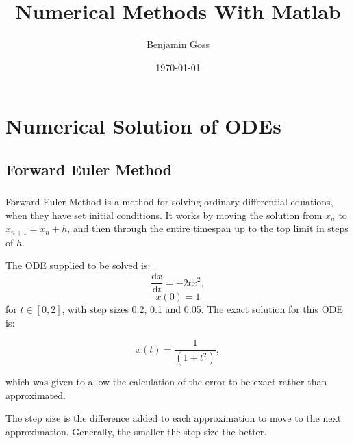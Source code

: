 \documentclass[a4paper]{article}
\title{Numerical Methods With Matlab}
\author{Benjamin Goss}
\date{\today}
\begin{document}
\maketitle


\section{Numerical Solution of ODEs}
\subsection{Forward Euler Method}
\subsubsection{}

Forward Euler Method is a method for solving ordinary differential equations, when they have set initial conditions. It works by moving the solution from $x_n$ to $x_{n+1} = x_n + h$, and then through the entire timespan up to the top limit in steps of $h$. 


The ODE supplied to be solved is:
$$\frac{\mathrm{d}x}{\mathrm{d}t} = -2tx^2,$$ $$x(0) = 1$$
for $t \in [0,2]$, with step sizes 0.2, 0.1 and 0.05. 
The exact solution for this ODE is:

$$x(t) = \frac{1}{(1+t^2)},$$

which was given to allow the calculation of the error to be exact rather than approximated.


The step size is the difference added to each approximation to move to the next approximation. Generally, the smaller the step size the better.

\end{document}
